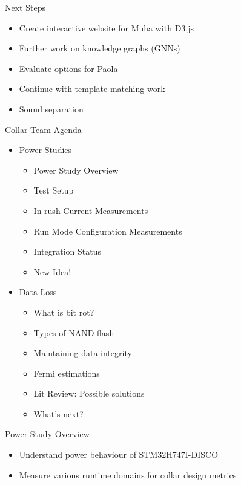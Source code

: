 \begin{frame}{Next Steps}
    \begin{itemize}
        \item Create interactive website for Muha with D3.js
        \item Further work on knowledge graphs (GNNs)
        \item Evaluate options for Paola
        \item Continue with template matching work
        \item Sound separation
    \end{itemize}
\end{frame}

\begin{frame}{Collar Team Agenda}
    \begin{itemize}
        \item Power Studies
        \begin{itemize}
            \item Power Study Overview
            \item Test Setup 
            \item In-rush Current Measurements
            \item Run Mode Configuration Measurements
            \item Integration Status
            \item New Idea!
        \end{itemize}
        \item Data Loss
        \begin{itemize}
            \item What is bit rot?
            \item Types of NAND flash
            \item Maintaining data integrity
            \item Fermi estimations
            \item Lit Review: Possible solutions
            \item What's next?
        \end{itemize}
    \end{itemize}
\end{frame}

\begin{frame}{Power Study Overview}
    \begin{itemize}
        \item Understand power behaviour of STM32H747I-DISCO
        \item Measure various runtime domains for collar design metrics
    \end{itemize}
\end{frame}

